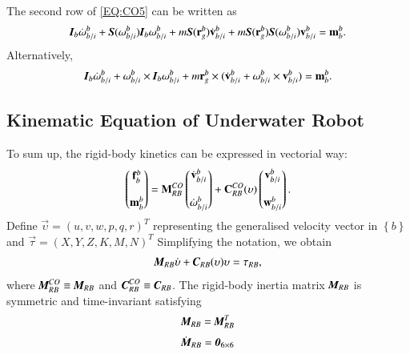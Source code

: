 The second row of \ref{EQ:CO5} can be written as
 \begin{align}
\emph{\textbf{I}}_{b}\dot{\vec{\omega}}^{b}_{b/i}+\emph{\textbf{S}}(\vec{\omega}^{b}_{b/i})\emph{\textbf{I}}_{b}\vec{\omega}^{b}_{b/i}+m\emph{\textbf{S}}(\vec{r}^{b}_{g})\dot{\vec{v}}^{b}_{b/i}+m\emph{\textbf{S}}(\vec{r}^{b}_{g})\emph{\textbf{S}}(\vec{\omega}^{b}_{b/i})\vec{v}^{b}_{b/i}=\vec{m}^{b}_{b}.
\end{align}
Alternatively,
\begin{align}
\emph{\textbf{I}}_{b}\dot{\vec{\omega}}^{b}_{b/i}
+\vec{\omega}^{b}_{b/i}\times\emph{\textbf{I}}_{b}\vec{\omega}^{b}_{b/i}
+m\vec{r}^{b}_{g}\times(\dot{\vec{v}}^{b}_{b/i}
+\vec{\omega}^{b}_{b/i}\times\vec{v}^{b}_{b/i})=\vec{m}^{b}_{b}.
\end{align}
\subsection{Kinematic Equation of Underwater Robot}
To sum up, the rigid-body kinetics can be expressed in vectorial way:
\begin{align}
\begin{pmatrix} \bigskip
\vec{f}_{b}^{b}\\
\vec{m}_{b}^{b}
\end{pmatrix}=
\bigskip\vec{M}_{RB}^{CO}
\begin{pmatrix}\bigskip
\dot{\vec{v}}^{b}_{b/i}\\ \dot{\vec{\omega}}^{b}_{b/i}
\end{pmatrix}
+
 \bigskip\vec{C}_{RB}^{CO}(\vec{\upsilon})\begin{pmatrix}\bigskip
\vec{v}^{b}_{b/i}\\ \vec{w}^{b}_{b/i}
\end{pmatrix}.\label{EQ:KinematicEquationGeneral}
\end{align}
Define $\vec{\upsilon}=(u,v,w,p,q,r)^{T}$ representing the generalised velocity vector in $\left\{ b \right\}$ and $\vec{\tau}=(X,Y,Z,K,M,N)^{T}$
Simplifying the notation, we obtain
\begin{align}
\emph{\textbf{M}}_{RB}\dot{\vec{\upsilon}}+\emph{\textbf{C}}_{RB}(\vec{\upsilon})\vec{\upsilon}=\vec{\tau}_{RB},
\end{align}
where $\emph{\textbf{M}}_{RB}^{CO}\equiv \emph{\textbf{M}}_{RB} $ and $\emph{\textbf{C}}_{RB}^{CO} \equiv  \emph{\textbf{C}}_{RB}$. The rigid-body inertia matrix $\emph{\textbf{M}}_{RB}$  is symmetric and time-invariant satisfying
\begin{align}
\emph{\textbf{M}}_{RB}=\emph{\textbf{M}}_{RB}^{T} 
\end{align}
\begin{align}
\dot{\emph{\textbf{M}}}_{RB}=\emph{\textbf{0}}_{6\times 6}
\end{align}
